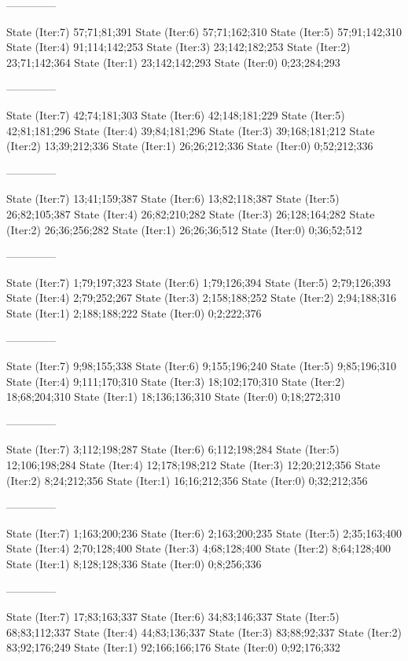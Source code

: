 \documentclass[a4paper,10pt,ngerman]{scrartcl}
\begin{document}
\begin{lstcs}
--------------

State (Iter:7) {57;71;81;391}
State (Iter:6) {57;71;162;310}
State (Iter:5) {57;91;142;310}
State (Iter:4) {91;114;142;253}
State (Iter:3) {23;142;182;253}
State (Iter:2) {23;71;142;364}
State (Iter:1) {23;142;142;293}
State (Iter:0) {0;23;284;293}

--------------

State (Iter:7) {42;74;181;303}
State (Iter:6) {42;148;181;229}
State (Iter:5) {42;81;181;296}
State (Iter:4) {39;84;181;296}
State (Iter:3) {39;168;181;212}
State (Iter:2) {13;39;212;336}
State (Iter:1) {26;26;212;336}
State (Iter:0) {0;52;212;336}

--------------

State (Iter:7) {13;41;159;387}
State (Iter:6) {13;82;118;387}
State (Iter:5) {26;82;105;387}
State (Iter:4) {26;82;210;282}
State (Iter:3) {26;128;164;282}
State (Iter:2) {26;36;256;282}
State (Iter:1) {26;26;36;512}
State (Iter:0) {0;36;52;512}

--------------

State (Iter:7) {1;79;197;323}
State (Iter:6) {1;79;126;394}
State (Iter:5) {2;79;126;393}
State (Iter:4) {2;79;252;267}
State (Iter:3) {2;158;188;252}
State (Iter:2) {2;94;188;316}
State (Iter:1) {2;188;188;222}
State (Iter:0) {0;2;222;376}

--------------

State (Iter:7) {9;98;155;338}
State (Iter:6) {9;155;196;240}
State (Iter:5) {9;85;196;310}
State (Iter:4) {9;111;170;310}
State (Iter:3) {18;102;170;310}
State (Iter:2) {18;68;204;310}
State (Iter:1) {18;136;136;310}
State (Iter:0) {0;18;272;310}

--------------

State (Iter:7) {3;112;198;287}
State (Iter:6) {6;112;198;284}
State (Iter:5) {12;106;198;284}
State (Iter:4) {12;178;198;212}
State (Iter:3) {12;20;212;356}
State (Iter:2) {8;24;212;356}
State (Iter:1) {16;16;212;356}
State (Iter:0) {0;32;212;356}

--------------

State (Iter:7) {1;163;200;236}
State (Iter:6) {2;163;200;235}
State (Iter:5) {2;35;163;400}
State (Iter:4) {2;70;128;400}
State (Iter:3) {4;68;128;400}
State (Iter:2) {8;64;128;400}
State (Iter:1) {8;128;128;336}
State (Iter:0) {0;8;256;336}

--------------

State (Iter:7) {17;83;163;337}
State (Iter:6) {34;83;146;337}
State (Iter:5) {68;83;112;337}
State (Iter:4) {44;83;136;337}
State (Iter:3) {83;88;92;337}
State (Iter:2) {83;92;176;249}
State (Iter:1) {92;166;166;176}
State (Iter:0) {0;92;176;332}


\end{lstcs}
\end{document}
